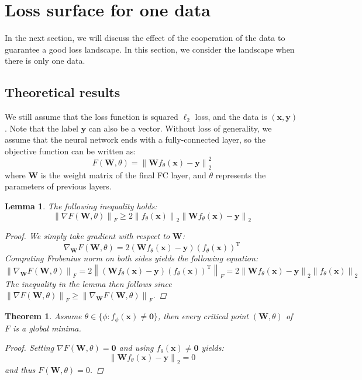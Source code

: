 \documentclass{article}
\theoremstyle{plain}
\newtheorem{thm}{Theorem}
\newtheorem{lem}{Lemma}
\theoremstyle{definition}
\newcommand{\norm}[1]{\left\lVert#1\right\rVert}
\begin{document}
\section{Loss surface for one data}

In the next section, we will discuss the effect of the cooperation of the data to guarantee a good loss landscape. In this section, we consider the landscape when there is only one data.

\subsection{Theoretical results}

We still assume that the loss function is squared $\ell_2$ loss, and the data is $(\mathbf{x},\mathbf{y})$. Note that the label $\mathbf{y}$ can also be a vector. Without loss of generality, we assume that the neural network ends with a fully-connected layer, so the objective function can be written as:
$$
F(\mathbf{W},\theta)=\norm{\mathbf{W}f_{\theta}(\mathbf{x})-\mathbf{y}}_2^2
$$
where $\mathbf{W}$ is the weight matrix of the final FC layer, and $\theta$ represents the parameters of previous layers.

\begin{lem}
The following inequality holds:
$$
\norm{\nabla F(\mathbf{W},\theta)}_F\geq 2\norm{f_{\theta}(\mathbf{x})}_2\norm{\mathbf{W}f_{\theta}(\mathbf{x})-\mathbf{y}}_2
$$

\begin{proof}
We simply take gradient with respect to $\mathbf{W}$:
$$
\nabla_{\mathbf{W}}F(\mathbf{W},\theta)=2(\mathbf{W}f_{\theta}(\mathbf{x})-\mathbf{y})\left(f_{\theta}(\mathbf{x})\right)^{\mathrm{T}}
$$
Computing Frobenius norm on both sides yields the following equation:
$$
\norm{\nabla_{\mathbf{W}}F(\mathbf{W},\theta)}_F=2\norm{(\mathbf{W}f_{\theta}(\mathbf{x})-\mathbf{y})\left(f_{\theta}(\mathbf{x})\right)^{\mathrm{T}}}_F=2\norm{\mathbf{W}f_{\theta}(\mathbf{x})-\mathbf{y}}_2\norm{f_{\theta}(\mathbf{x})}_2
$$
The inequality in the lemma then follows since $\norm{\nabla F(\mathbf{W},\theta)}_F\geq\norm{\nabla_{\mathbf{W}}F(\mathbf{W},\theta)}_F$.
\end{proof}
\end{lem}

\begin{thm}
Assume $\theta\in\{\phi:f_{\phi}(\mathbf{x})\neq\mathbf{0}\}$, then every critical point $(\mathbf{W},\theta)$ of $F$ is a global minima.

\begin{proof}
Setting $\nabla F(\mathbf{W},\theta)=\mathbf{0}$ and using $f_{\theta}(\mathbf{x})\neq\mathbf{0}$ yields:
$$
\norm{\mathbf{W}f_{\theta}(\mathbf{x})-\mathbf{y}}_2=0
$$
and thus $F(\mathbf{W},\theta)=0$.
\end{proof}
\end{thm}
\end{document}
